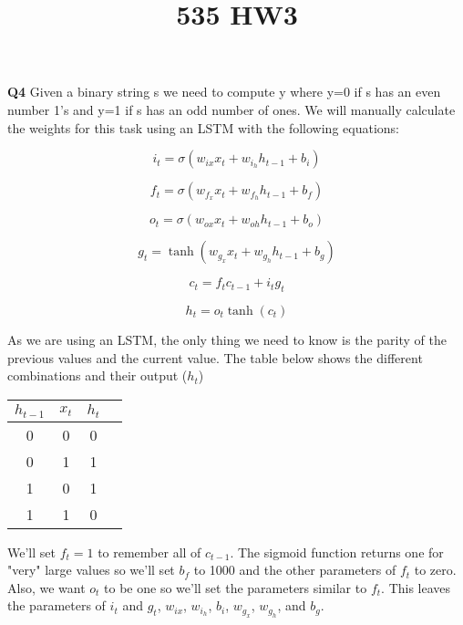 \documentclass{article}
\title{535 HW3}
\begin{document}
\textbf{Q4} Given a binary string s we need to compute y where y=0 if s has an even number 1's and y=1 if s has an odd number of ones. We will manually calculate the weights for this task using an LSTM with the following equations:


\begin{equation}
    i_t = \sigma(w_{ix}x_t + w_{i_h}h_{t-1}+b_i) 
\end{equation}

\begin{equation}
    f_t = \sigma(w_{f_x}x_t + w_{f_h}h_{t-1}+b_f) 
\end{equation}

\begin{equation}
    o_t = \sigma(w_{ox}x_t + w_{oh}h_{t-1}+b_o) 
\end{equation}

\begin{equation}
    g_t = \tanh(w_{g_x}x_t + w_{g_h}h_{t-1}+b_g) 
\end{equation}

\begin{equation}
    c_t = f_t c_{t-1} + i_t g_t
\end{equation}

\begin{equation}
    h_t = o_t\tanh(c_t)
\end{equation}

As we are using an LSTM, the only thing we need to know is the parity of the previous values and the current value. The table below shows the different combinations and their output ($h_t$)

\begin{center}\begin{tabular}{ |c|c|c|c| } 
\hline
$h_{t-1}$ & $x_t$ & $h_t$ \\
\hline
0 & 0 & 0 \\ 
0 & 1 & 1 \\ 
1 & 0 & 1 \\ 
1 & 1 & 0 \\ 
\hline
\end{tabular}\end{center}

We'll set $f_t=1$ to remember all of $c_{t-1}$. The sigmoid function returns one for "very" large values so we'll set $b_f$ to 1000 and the other parameters of $f_t$ to zero. Also, we want $o_t$ to be one so we'll set the parameters similar to $f_t$. This leaves the parameters of $i_t$ and $g_t$, $w_{ix}$, $w_{i_h}$, $b_i$, $w_{g_x}$, $w_{g_h}$, and $b_g$.
\end{document}
